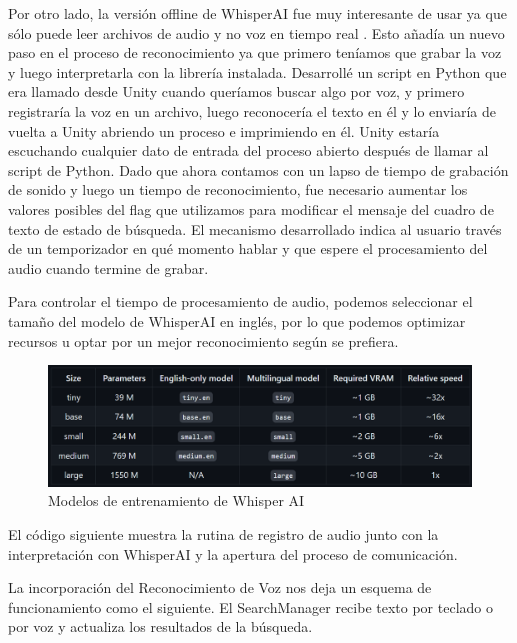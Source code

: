 Por otro lado, la versión offline de WhisperAI fue muy interesante de usar ya que sólo puede leer archivos de audio y no voz en tiempo real \cite[]{WhisperAI}. Esto añadía un nuevo paso en el proceso de reconocimiento ya que primero teníamos que grabar la voz y luego interpretarla con la librería instalada.
Desarrollé un script en Python que era llamado desde Unity cuando queríamos buscar algo por voz, y primero registraría la voz en un archivo, luego reconocería el texto en él y lo enviaría de vuelta a Unity abriendo un proceso e imprimiendo en él.
Unity estaría escuchando cualquier dato de entrada del proceso abierto después de llamar al script de Python. Dado que ahora contamos con un lapso de tiempo de grabación de sonido y luego un tiempo de reconocimiento, fue necesario aumentar los valores posibles del flag que utilizamos para modificar el mensaje del cuadro de texto de estado de búsqueda. El mecanismo desarrollado indica al usuario través de un temporizador en qué momento hablar y que espere el procesamiento del audio cuando termine de grabar.

Para controlar el tiempo de procesamiento de audio, podemos seleccionar el tamaño del modelo de WhisperAI en inglés, por lo que podemos optimizar recursos u optar por un mejor reconocimiento según se prefiera.

\begin{figure}[ht]
   \begin{center}
      \includegraphics[width=0.85\linewidth]{chapter2/figures/whisperai.png}
   \end{center}
   \caption[Modelos de entrenamiento de Whisper AI]
   {\footnotesize Modelos de entrenamiento de Whisper AI}
\end{figure}

El código siguiente muestra la rutina de registro de audio junto con la interpretación con WhisperAI y la apertura del proceso de comunicación.



La incorporación del Reconocimiento de Voz nos deja un esquema de funcionamiento como el siguiente. El SearchManager recibe texto por teclado o por voz y actualiza los resultados de la búsqueda.

